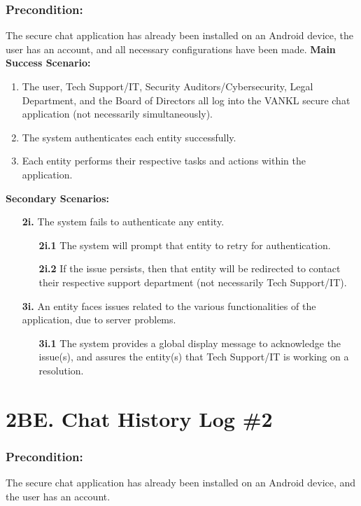 \documentclass[]{article}
\begin{document}
\subsubsection*{Precondition:} The secure chat application has already been installed on an Android device, the user has an account, and all necessary configurations have been made.\newline\newline
\textbf{Main Success Scenario:}
\begin{enumerate}
	\item The user, Tech Support/IT, Security Auditors/Cybersecurity, Legal Department, and the Board of Directors all log into the VANKL secure chat application (not necessarily simultaneously).
	\item The system authenticates each entity successfully.
	\item Each entity performs their respective tasks and actions within the application.
\end{enumerate}
\textbf{Secondary Scenarios:}
\begin{enumerate}
	\item[\textbf{2i.}] The system fails to authenticate any entity.
		\begin{enumerate}
			\item[\textbf{2i.1}] The system will prompt that entity to retry for authentication.
			\item[\textbf{2i.2}] If the issue persists, then that entity will be redirected to contact their respective support department (not necessarily Tech Support/IT).
		\end{enumerate}
	\item[\textbf{3i.}] An entity faces issues related to the various functionalities of the application, due to server problems.
		\begin{enumerate}
			\item[\textbf{3i.1}] The system provides a global display message to acknowledge the issue(s), and assures the entity(s) that Tech Support/IT is working on a resolution.
		\end{enumerate}
\end{enumerate}

\section*{2BE. Chat History Log \#2}
\subsubsection*{Precondition:} The secure chat application has already been installed on an Android device, and the user has an account.
\end{document}
